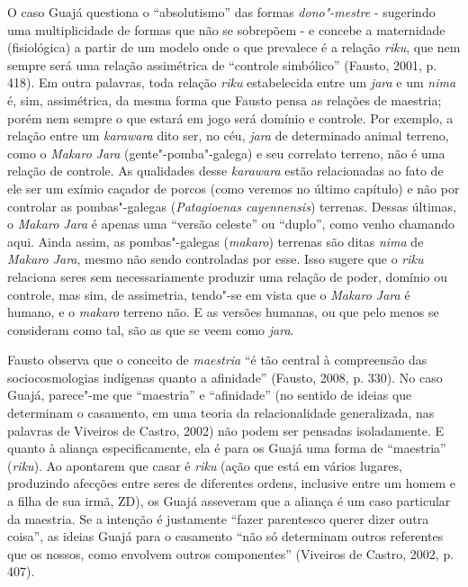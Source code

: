 O caso Guajá questiona o ``absolutismo'' das formas \emph{dono"-mestre} -
sugerindo uma multiplicidade de formas que não se sobrepõem - e concebe
a maternidade (fisiológica) a partir de um modelo onde o que prevalece é
a relação \emph{riku}, que nem sempre será uma relação assimétrica de
``controle simbólico'' (Fausto, 2001, p. 418). Em outra palavras, toda
relação \emph{riku} estabelecida entre um \emph{jara} e um \emph{nima}
é, sim, assimétrica, da mesma forma que Fausto pensa as relações de
maestria; porém nem sempre o que estará em jogo será domínio e controle.
Por exemplo, a relação entre um \emph{karawara} dito ser, no céu,
\emph{jara} de determinado animal terreno, como o \emph{Makaro}
\emph{Jara} (gente"-pomba"-galega) e seu correlato terreno, não é uma
relação de controle. As qualidades desse \emph{karawara} estão
relacionadas ao fato de ele ser um exímio caçador de porcos (como
veremos no último capítulo) e não por controlar as pombas"-galegas
(\emph{Patagioenas cayennensis}) terrenas. Dessas últimas, o
\emph{Makaro Jara} é apenas uma ``versão celeste'' ou ``duplo'', como venho
chamando aqui. Ainda assim, as pombas"-galegas (\emph{makaro}) terrenas
são ditas \emph{nima} de \emph{Makaro Jara}, mesmo não sendo controladas
por esse. Isso sugere que o \emph{riku} relaciona seres sem
necessariamente produzir uma relação de poder, domínio ou controle, mas
sim, de assimetria, tendo"-se em vista que o \emph{Makaro Jara} é humano,
e o \emph{makaro} terreno não. E as versões humanas, ou que pelo menos
se consideram como tal, são as que se veem como \emph{jara}.

Fausto observa que o conceito de \emph{maestria} ``é tão central à
compreensão das sociocosmologias indígenas quanto a afinidade'' (Fausto,
2008, p. 330). No caso Guajá, parece"-me que ``maestria'' e ``afinidade''
(no sentido de ideias que determinam o casamento, em uma teoria da
relacionalidade generalizada, nas palavras de Viveiros de Castro, 2002)
não podem ser pensadas isoladamente. E quanto à aliança especificamente,
ela é para os Guajá uma forma de ``maestria'' (\emph{riku}). Ao apontarem
que casar é \emph{riku} (ação que está em vários lugares, produzindo
afecções entre seres de diferentes ordens, inclusive entre um homem e a
filha de sua irmã, ZD), os Guajá asseveram que a aliança é um caso
particular da maestria. Se a intenção é justamente ``fazer parentesco
querer dizer outra coisa'', as ideias Guajá para o casamento ``não só
determinam outros referentes que os nossos, como envolvem outros
componentes'' (Viveiros de Castro, 2002, p. 407).


